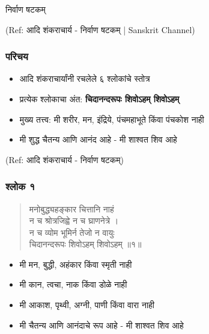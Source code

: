 \begin{frame}[fragile]\frametitle{}
\begin{center}
{\Large निर्वाण षटकम्}
\end{center}

{\tiny (Ref: आदि शंकराचार्य - निर्वाण षटकम् | Sanskrit Channel)}

\end{frame}

\begin{frame}[fragile]\frametitle{परिचय}

	\begin{itemize}
	\item आदि शंकराचार्यांनी रचलेले ६ श्लोकांचे स्तोत्र
	\item प्रत्येक श्लोकाचा अंत: \textbf{चिदानन्दरूपः शिवोऽहम् शिवोऽहम्}
	\item मुख्य तत्त्व: मी शरीर, मन, इंद्रिये, पंचमहाभूते किंवा पंचकोश नाही
	\item मी शुद्ध चैतन्य आणि आनंद आहे - मी शाश्वत शिव आहे
	\end{itemize}

{\tiny (Ref: आदि शंकराचार्य - निर्वाण षटकम्)}

\end{frame}

\begin{frame}[fragile]\frametitle{श्लोक १}

\begin{verse}
मनोबुद्ध्यहङ्कार चित्तानि नाहं \\
न च श्रोत्रजिह्वे न च घ्राणनेत्रे । \\
न च व्योम भूमिर्न तेजो न वायुः \\
चिदानन्दरूपः शिवोऽहम् शिवोऽहम् ॥१॥
\end{verse}

	\begin{itemize}
	\item मी मन, बुद्धी, अहंकार किंवा स्मृती नाही
	\item मी कान, त्वचा, नाक किंवा डोळे नाही
	\item मी आकाश, पृथ्वी, अग्नी, पाणी किंवा वारा नाही
	\item मी चैतन्य आणि आनंदाचे रूप आहे - मी शाश्वत शिव आहे
	\end{itemize}

\end{frame}

